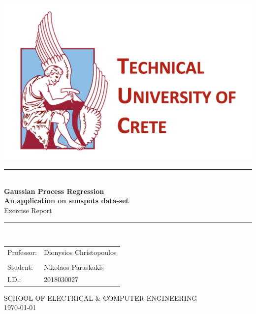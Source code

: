 \documentclass[12pt,a4paper]{article}
\begin{document}
\begin{titlepage}

	\begin{center}

		\includegraphics[scale=0.5] {tuc_logo_text.png} \\[3cm]

		\large
		\rule{0.8\textwidth}{2pt} \\[0.5cm]
		
		\textbf{\Large{Gaussian Process Regression}} \\[0.5cm]
		\textbf{\Large{An application on sunspots data-set}} \\[1.5cm]
		{\Large{Exercise Report}} \\[0.1cm]
		\rule{0.8\textwidth}{2pt} \\[4cm]
		
		\begin{tabular}{l l}
		    \large{Professor:} & \large{Dionysios Christopoulos}\\\\
			\large{Student:} & \large{Nikolaos Paraskakis} \\
			\large{I.D.:} & \large{2018030027} \\
		\end{tabular}
		
		\vspace{5cm}
		\textmd{\large{SCHOOL OF ELECTRICAL \& COMPUTER ENGINEERING}} \\[0.5cm]
		\today \\
		
	\end{center}
		
\end{titlepage}
\end{document}
